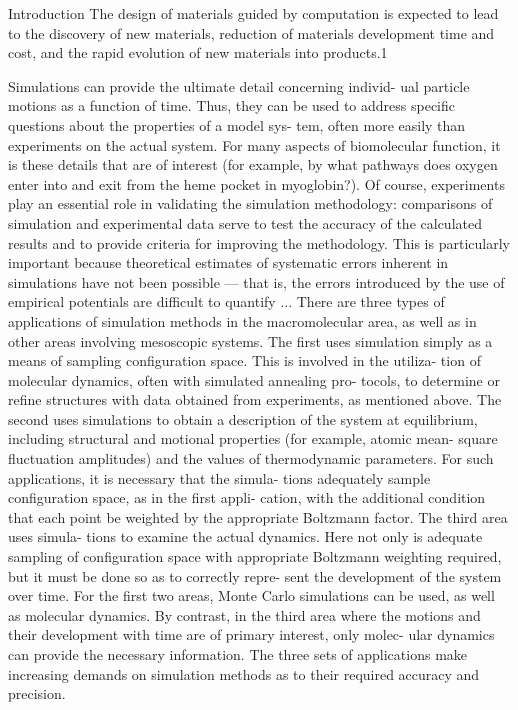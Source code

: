 \begin{chapter}{Introduction}
The design of materials guided by computation is expected to
lead to the discovery of new materials, reduction of materials development
time and cost, and the rapid evolution of new materials into products.1
\cite{Chen2015}

Simulations can provide the ultimate detail concerning individ- ual particle
motions as a function of time. Thus, they can be used to address specific
questions about the properties of a model sys- tem, often more easily than
experiments on the actual system. For many aspects of biomolecular function,
it is these details that are of interest (for example, by what pathways does
oxygen enter into and exit from the heme pocket in myoglobin?). Of course,
experiments play an essential role in validating the simulation methodology:
comparisons of simulation and experimental data serve to test the accuracy of
the calculated results and to provide criteria for improving the methodology.
This is particularly important because theoretical estimates of systematic
errors inherent in simulations have not been possible — that is, the errors
introduced by the use of empirical potentials are difficult to quantify
...
There are three types of applications of simulation methods in the
macromolecular area, as well as in other areas involving mesoscopic systems.
The first uses simulation simply as a means of sampling configuration space.
This is involved in the utiliza- tion of molecular dynamics, often with
simulated annealing pro- tocols, to determine or refine structures with data
obtained from
experiments, as mentioned above. The second uses simulations to obtain a
description of the system at equilibrium, including structural and motional
properties (for example, atomic mean- square fluctuation amplitudes) and the
values of thermodynamic parameters. For such applications, it is necessary
that the simula- tions adequately sample configuration space, as in the first
appli- cation, with the additional condition that each point be weighted by
the appropriate Boltzmann factor. The third area uses simula- tions to examine
the actual dynamics. Here not only is adequate sampling of configuration space
with appropriate Boltzmann weighting required, but it must be done so as to
correctly repre- sent the development of the system over time. For the first
two areas, Monte Carlo simulations can be used, as well as molecular dynamics.
By contrast, in the third area where the motions and their development with
time are of primary interest, only molec- ular dynamics can provide the
necessary information. The three sets of applications make increasing demands
on simulation methods as to their required accuracy and precision.
\cite{Karplus2002}


\end{chapter}
